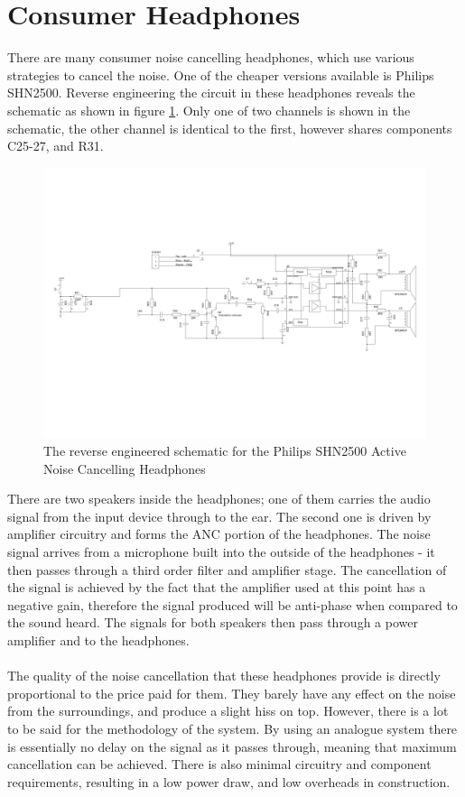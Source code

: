 \section{Consumer Headphones}
\label{sec:philipsphones}
There are many consumer noise cancelling headphones, which use various strategies to cancel the noise.
One of the cheaper versions available is Philips SHN2500.
Reverse engineering the circuit in these headphones reveals the schematic as shown in figure \ref{fig:philipsphonessche}.
Only one of two channels is shown in the schematic, the other channel is identical to the first, however shares components C25-27, and R31.
\\
\begin{figure}
	\centering
	\includegraphics[width=\textwidth]{./img/hp.pdf}
	\caption{The reverse engineered schematic for the Philips SHN2500 Active Noise Cancelling Headphones}
	\label{fig:philipsphonessche}
\end{figure}

\noindent
There are two speakers inside the headphones; one of them carries the audio signal from the input device through to the ear.
The second one is driven by amplifier circuitry and forms the ANC portion of the headphones.
The noise signal arrives from a microphone built into the outside of the headphones - it then passes through a third order filter and amplifier stage.
The cancellation of the signal is achieved by the fact that the amplifier used at this point has a negative gain, therefore the signal produced will be anti-phase when compared to the sound heard.
The signals for both speakers then pass through a power amplifier and to the headphones.
\\
\\
The quality of the noise cancellation that these headphones provide is directly proportional to the price paid for them. They barely have any effect on the noise from the surroundings, and produce a slight hiss on top.
However, there is a lot to be said for the methodology of the system. By using an analogue system there is essentially no delay on the signal as it passes through, meaning that maximum cancellation can be achieved.
There is also minimal circuitry and component requirements, resulting in a low power draw, and low overheads in construction.
